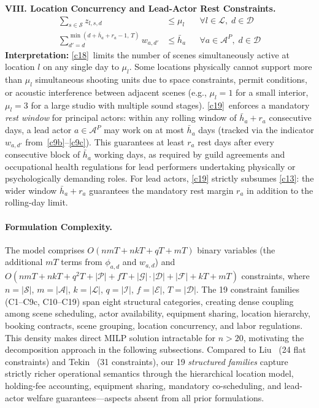 \medskip
\noindent\textbf{VIII. Location Concurrency and Lead-Actor Rest Constraints.}
\vspace{-4pt}
\begin{align}
\sum_{s \in \mathcal{S}} z_{l,s,d} &\leq \mu_l && \forall l \in \mathcal{L},\; d \in \mathcal{D} \tag{C18}\label{c18}\\
\sum_{d'=d}^{\min(d + \bar{h}_a + r_a - 1,\, T)} w_{a,d'} &\leq \bar{h}_a && \forall a \in \mathcal{A}^P,\; d \in \mathcal{D} \tag{C19}\label{c19}
\end{align}
\textbf{Interpretation:}
\ref{c18}~limits the number of scenes simultaneously active at location $l$ on any single day to $\mu_l$.
Some locations physically cannot support more than $\mu_l$ simultaneous shooting units due to space constraints, permit conditions, or acoustic interference between adjacent scenes (e.g., $\mu_l = 1$ for a small interior, $\mu_l = 3$ for a large studio with multiple sound stages).
\ref{c19}~enforces a mandatory \emph{rest window} for principal actors: within any rolling window of $\bar{h}_a + r_a$ consecutive days, a lead actor $a \in \mathcal{A}^P$ may work on at most $\bar{h}_a$ days (tracked via the indicator $w_{a,d'}$ from~\ref{c9b}--\ref{c9c}).
This guarantees at least $r_a$ rest days after every consecutive block of $\bar{h}_a$ working days, as required by guild agreements and occupational health regulations for lead performers undertaking physically or psychologically demanding roles.
For lead actors, \ref{c19} strictly subsumes \ref{c13}: the wider window $\bar{h}_a + r_a$ guarantees the mandatory rest margin $r_a$ in addition to the rolling-day limit.

\paragraph{Formulation Complexity.}
The model comprises $O(nmT + nkT + qT + mT)$ binary variables (the additional $mT$ terms from $\phi_{a,d}$ and $w_{a,d}$) and $O(nmT + nkT + q^2 T + |\mathcal{P}| + fT + |\mathcal{G}| \cdot |\mathcal{D}| + |\mathcal{F}| + kT + mT)$ constraints, where $n{=}|\mathcal{S}|$, $m{=}|\mathcal{A}|$, $k{=}|\mathcal{L}|$, $q{=}|\mathcal{I}|$, $f{=}|\mathcal{E}|$, $T{=}|\mathcal{D}|$.
The 19 constraint families (C1--C9c, C10--C19) span eight structural categories, creating dense coupling among scene scheduling, actor availability, equipment sharing, location hierarchy, booking contracts, scene grouping, location concurrency, and labor regulations.
This density makes direct MILP solution intractable for $n > 20$, motivating the decomposition approach in the following subsections.
Compared to Liu~\citep{liu2019} (24 flat constraints) and Tekin~\citep{tekin2023} (31 constraints), our 19 \emph{structured families} capture strictly richer operational semantics through the hierarchical location model, holding-fee accounting, equipment sharing, mandatory co-scheduling, and lead-actor welfare guarantees---aspects absent from all prior formulations.

